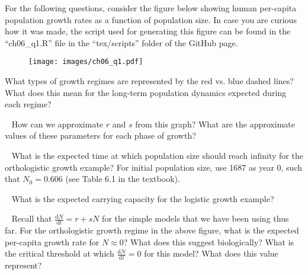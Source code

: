\documentclass[12pt]{article}
\begin{document}
\date{}
\maketitle

For the following questions, consider the figure below showing human per-capita population growth rates as a function of population size. In case you are curious how it was made, the script used for generating this figure can be found in the ``ch06\_q1.R'' file in the ``tex/scripts'' folder of the GitHub page.

\begin{figure}[ht]
  \texttt{[image: images/ch06\_q1.pdf]}
\end{figure}

\pagebreak
{}
\newline
What types of growth regimes are represented by the red vs. blue dashed lines? What does this mean for the long-term population dynamics expected during each regime?

~\newline
{}
\newline
How can we approximate $r$ and $s$ from this graph? What are the approximate values of these parameters for each phase of growth?

~\newline
{}
\newline
What is the expected time at which population size should reach infinity for the orthologistic growth example? For initial population size, use 1687 as year 0, such that $N_0 = 0.606$ (see Table 6.1 in the textbook).

~\newline
{}
\newline
What is the expected carrying capacity for the logistic growth example?

~\newline
{}
\newline
Recall that $\frac{\mathrm{d}N}{\mathrm{d}t} = r + sN$ for the simple models that we have been using thus far. For the orthologistic growth regime in the above figure, what is the expected per-capita growth rate for $N \approx 0$? What does this suggest biologically? What is the critical threshold at which $\frac{\mathrm{d}N}{\mathrm{d}t} = 0$ for this model? What does this value represent?

~\newline
\end{document}
